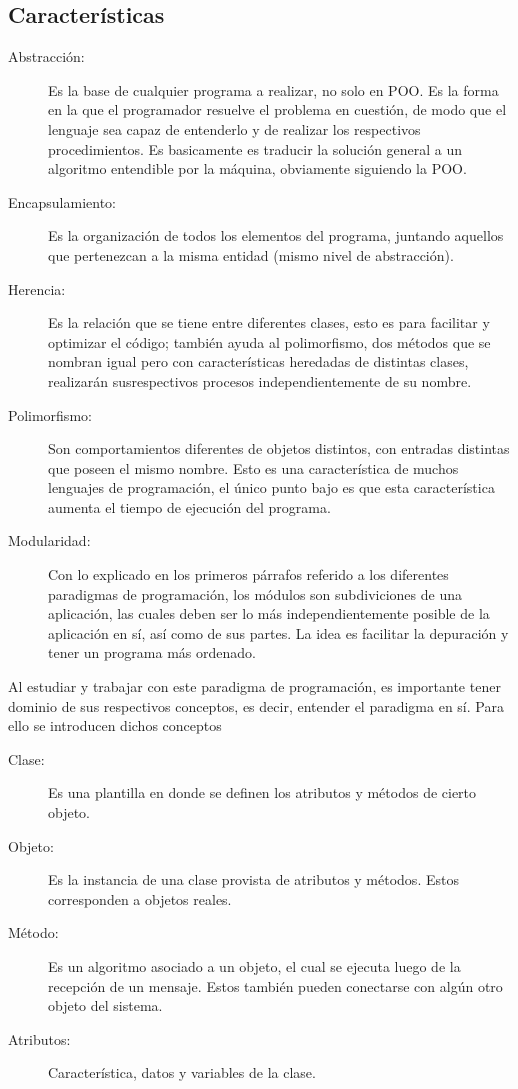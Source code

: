 \subsection{Características}
\begin{description}
	\item[Abstracción: ] Es la base de cualquier programa a realizar, no solo en POO. Es la forma en la que el programador resuelve el problema en cuestión, de modo que el lenguaje sea capaz de entenderlo y de realizar los respectivos procedimientos. Es basicamente es traducir la solución general a un algoritmo entendible por la máquina, obviamente siguiendo la POO.
	\item[Encapsulamiento: ] Es la organización de todos los elementos del programa, juntando aquellos que pertenezcan a la misma entidad (mismo nivel de abstracción).
	\item[Herencia: ] Es la relación que se tiene entre diferentes clases, esto es para facilitar y optimizar el código; también ayuda al polimorfismo, dos métodos que se nombran igual pero con características heredadas de distintas clases, realizarán susrespectivos procesos independientemente de su nombre.
	\item[Polimorfismo: ] Son comportamientos diferentes de objetos distintos, con entradas distintas que poseen el mismo nombre. Esto es una característica de muchos lenguajes de programación, el único punto bajo es que esta característica aumenta el tiempo de ejecución del programa.
	\item[Modularidad: ] Con lo explicado en los primeros párrafos referido a los diferentes paradigmas de programación, los módulos son subdiviciones de una aplicación, las cuales deben ser lo más independientemente posible de la aplicación en sí, así como de sus partes. La idea es facilitar la depuración y tener un programa más ordenado.
\end{description}

\newpage

Al estudiar y trabajar con este paradigma de programación, es importante tener dominio de sus respectivos conceptos, es decir, entender el paradigma en sí. Para ello se introducen dichos conceptos

\begin{description}
	\item[Clase: ] Es una plantilla en donde se definen los atributos y métodos de cierto objeto.
	\item[Objeto: ] Es la instancia de una clase provista de atributos y métodos. Estos corresponden a objetos reales.
	\item[Método: ] Es un algoritmo asociado a un objeto, el cual se ejecuta luego de la recepción de un mensaje. Estos también pueden conectarse con algún otro objeto del sistema.
	\item[Atributos: ] Característica, datos y variables de la clase.
\end{description}

